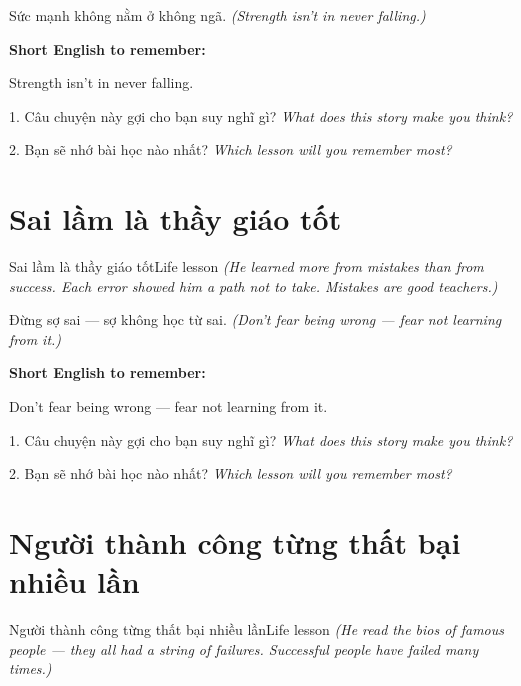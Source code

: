 \begin{baihoc}
Sức mạnh không nằm ở không ngã.
\textit{(Strength isn't in never falling.)}
\end{baihoc}

\begin{ghinhoanh}
\textbf{Short English to remember:}

Strength isn't in never falling.

\end{ghinhoanh}

\begin{tuhocnhanh}
1. Câu chuyện này gợi cho bạn suy nghĩ gì? \textit{What does this story make you think?}

2. Bạn sẽ nhớ bài học nào nhất? \textit{Which lesson will you remember most?}
\end{tuhocnhanh}
\ngancach


\section{Sai lầm là thầy giáo tốt}
\begin{truyen}{Sai lầm là thầy giáo tốt}{Life lesson}
\textit{(He learned more from mistakes than from success. Each error showed him a path not to take. Mistakes are good teachers.)}
\end{truyen}

\begin{baihoc}
Đừng sợ sai — sợ không học từ sai.
\textit{(Don't fear being wrong — fear not learning from it.)}
\end{baihoc}

\begin{ghinhoanh}
\textbf{Short English to remember:}

Don't fear being wrong — fear not learning from it.

\end{ghinhoanh}

\begin{tuhocnhanh}
1. Câu chuyện này gợi cho bạn suy nghĩ gì? \textit{What does this story make you think?}

2. Bạn sẽ nhớ bài học nào nhất? \textit{Which lesson will you remember most?}
\end{tuhocnhanh}
\ngancach


\section{Người thành công từng thất bại nhiều lần}
\begin{truyen}{Người thành công từng thất bại nhiều lần}{Life lesson}
\textit{(He read the bios of famous people — they all had a string of failures. Successful people have failed many times.)}
\end{truyen}

